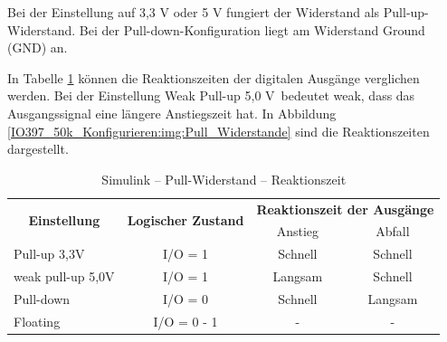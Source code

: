 Bei der Einstellung auf 3,3 V oder 5 V fungiert der Widerstand als Pull-up-Widerstand. Bei der Pull-down-Konfiguration liegt am Widerstand Ground (GND) an.



In Tabelle \ref{IO397_50k_Konfigurieren:tab:Reaktionszeit} können die Reaktionszeiten der digitalen Ausgänge verglichen werden. Bei der Einstellung \frqq Weak Pull-up 5,0 V\flqq\ bedeutet \frqq weak\flqq, dass das Ausgangssignal eine längere Anstiegszeit hat. In Abbildung \ref{IO397_50k_Konfigurieren:img:Pull_Widerstande} sind die Reaktionszeiten dargestellt.


\pagebreak[1]
\begin{table}[!ht]
	\centering
	\caption{Simulink – Pull-Widerstand – Reaktionszeit}
	\label{IO397_50k_Konfigurieren:tab:Reaktionszeit}
	\begin{tabular}{lccc}
		\hline
		\multicolumn{1}{c}{\multirow{2}{*}{\textbf{Einstellung}}} & \multicolumn{1}{c}{\multirow{2}{*}{\textbf{Logischer Zustand}}} & \multicolumn{2}{c}{\textbf{Reaktionszeit der Ausgänge}}           \\ \cline{3-4}
		\multicolumn{1}{c}{}                                      & \multicolumn{1}{c}{}                                            & Anstieg                                                 & Abfall  \\ \hline
		\multicolumn{1}{l|}{Pull-up 3,3V}                         & I/O = 1                                                         & Schnell                                                 & Schnell \\
		\multicolumn{1}{l|}{weak pull-up 5,0V}                    & I/O = 1                                                         & Langsam                                                 & Schnell \\
		\multicolumn{1}{l|}{Pull-down}                            & I/O = 0                                                         & Schnell                                                 & Langsam \\
		\multicolumn{1}{l|}{Floating}                             & I/O = 0 - 1                                                     & -                                                       & -       \\ \hline
	\end{tabular}
\end{table}
\pagebreak[1]



